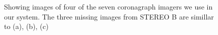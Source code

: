 \documentclass[journal]{vgtc}                %
\begin{document}
\begin{figure}
\caption{Showing images of four of the seven coronagraph imagers we use in our system. The three missing images from STEREO B are simillar to (a), (b), (c)}
\label{fig:coronagraph}
\end{figure}
\end{document}
